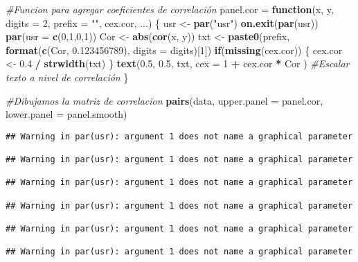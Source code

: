 \documentclass[
]{article}
\newenvironment{Shaded}{\begin{snugshade}}{\end{snugshade}}
\newcommand{\AttributeTok}[1]{\textcolor[rgb]{0.13,0.29,0.53}{#1}}
\newcommand{\CommentTok}[1]{\textcolor[rgb]{0.56,0.35,0.01}{\textit{#1}}}
\newcommand{\ControlFlowTok}[1]{\textcolor[rgb]{0.13,0.29,0.53}{\textbf{#1}}}
\newcommand{\DecValTok}[1]{\textcolor[rgb]{0.00,0.00,0.81}{#1}}
\newcommand{\FloatTok}[1]{\textcolor[rgb]{0.00,0.00,0.81}{#1}}
\newcommand{\FunctionTok}[1]{\textcolor[rgb]{0.13,0.29,0.53}{\textbf{#1}}}
\newcommand{\NormalTok}[1]{#1}
\newcommand{\OtherTok}[1]{\textcolor[rgb]{0.56,0.35,0.01}{#1}}
\newcommand{\SpecialCharTok}[1]{\textcolor[rgb]{0.81,0.36,0.00}{\textbf{#1}}}
\newcommand{\StringTok}[1]{\textcolor[rgb]{0.31,0.60,0.02}{#1}}
\begin{document}
\begin{Shaded}
\begin{Highlighting}[]
\CommentTok{\#Funcion para agregar coeficientes de correlación}
\NormalTok{panel.cor }\OtherTok{=} \ControlFlowTok{function}\NormalTok{(x, y, }\AttributeTok{digits =} \DecValTok{2}\NormalTok{, }\AttributeTok{prefix =} \StringTok{""}\NormalTok{, cex.cor, ...) \{}
\NormalTok{  usr }\OtherTok{\textless{}{-}} \FunctionTok{par}\NormalTok{(}\StringTok{"usr"}\NormalTok{)}
  \FunctionTok{on.exit}\NormalTok{(}\FunctionTok{par}\NormalTok{(usr))}
  \FunctionTok{par}\NormalTok{(}\AttributeTok{usr =} \FunctionTok{c}\NormalTok{(}\DecValTok{0}\NormalTok{,}\DecValTok{1}\NormalTok{,}\DecValTok{0}\NormalTok{,}\DecValTok{1}\NormalTok{))}
\NormalTok{  Cor }\OtherTok{\textless{}{-}} \FunctionTok{abs}\NormalTok{(}\FunctionTok{cor}\NormalTok{(x, y))}
\NormalTok{  txt }\OtherTok{\textless{}{-}} \FunctionTok{paste0}\NormalTok{(prefix, }\FunctionTok{format}\NormalTok{(}\FunctionTok{c}\NormalTok{(Cor, }\FloatTok{0.123456789}\NormalTok{), }\AttributeTok{digits =}\NormalTok{ digits)[}\DecValTok{1}\NormalTok{])}
  \ControlFlowTok{if}\NormalTok{(}\FunctionTok{missing}\NormalTok{(cex.cor)) \{}
\NormalTok{    cex.cor }\OtherTok{\textless{}{-}} \FloatTok{0.4} \SpecialCharTok{/} \FunctionTok{strwidth}\NormalTok{(txt)}
\NormalTok{  \}}
  \FunctionTok{text}\NormalTok{(}\FloatTok{0.5}\NormalTok{, }\FloatTok{0.5}\NormalTok{, txt,}
       \AttributeTok{cex =} \DecValTok{1} \SpecialCharTok{+}\NormalTok{ cex.cor }\SpecialCharTok{*}\NormalTok{ Cor ) }\CommentTok{\#Escalar texto a nivel de correlación }
\NormalTok{\}}

\CommentTok{\#Dibujamos la matriz de correlacion }
\FunctionTok{pairs}\NormalTok{(data, }
      \AttributeTok{upper.panel =}\NormalTok{ panel.cor,}
      \AttributeTok{lower.panel =}\NormalTok{ panel.smooth)}
\end{Highlighting}
\end{Shaded}

\begin{verbatim}
## Warning in par(usr): argument 1 does not name a graphical parameter

## Warning in par(usr): argument 1 does not name a graphical parameter

## Warning in par(usr): argument 1 does not name a graphical parameter

## Warning in par(usr): argument 1 does not name a graphical parameter

## Warning in par(usr): argument 1 does not name a graphical parameter

## Warning in par(usr): argument 1 does not name a graphical parameter
\end{verbatim}
\end{document}
